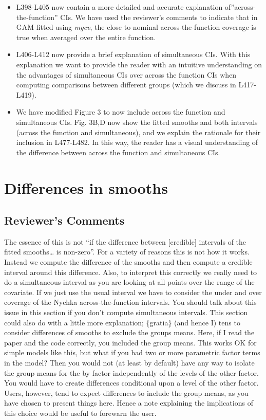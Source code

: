 \documentclass[
]{article}
\begin{document}
\begin{itemize}
\item
  L398-L405 now contain a more detailed and accurate explanation of''across-the-function'' CIs. We have used the reviewer's comments to indicate that in GAM fitted using \emph{mgcv}, the close to nominal across-the-function coverage is true when averaged over the entire function.
\item
  L406-L412 now provide a brief explanation of simultaneous CIs. With this explanation we want to provide the reader with an intuitive understanding on the advantages of simultaneous CIs over across the function CIs when computing comparisons between different groups (which we discuss in L417-L419).
\item
  We have modified Figure 3 to now include across the function and simultaneous CIs. Fig. 3B,D now show the fitted smooths and both intervals (across the function and simultaneous), and we explain the rationale for their inclusion in L477-L482. In this way, the reader has a visual understanding of the difference between across the function and simultaneous CIs.
\end{itemize}

\hypertarget{differences-in-smooths}{%
\section{Differences in smooths}\label{differences-in-smooths}}

\hypertarget{reviewers-comments-8}{%
\subsection{Reviewer's Comments}\label{reviewers-comments-8}}

The essence of this is not ``if the difference between {[}credible{]} intervals of the fitted smooths\ldots{} is non-zero''. For a variety of reasons this is not how it works. Instead we compute the difference of the smooths and then compute a credible interval around this difference. Also, to interpret this correctly we really need to do a simultaneous interval as you are looking at all points over the range of the covariate. If we just use the usual interval we have to consider the under and over coverage of the Nychka across-the-function intervals. You should talk about this issue in this section if you don't compute simultaneous intervals.
This section could also do with a little more explanation; \{gratia\} (and hence I) tens to consider differences of smooths to exclude the groups means. Here, if I read the paper and the code correctly, you included the group means. This works OK for simple models like this, but what if you had two or more parametric factor terms in the model? Then you would not (at least by default) have any way to isolate the group means for the by factor independently of the levels of the other factor. You would have to create differences conditional upon a level of the other factor. Users, however, tend to expect differences to include the group means, as you have chosen to present things here. Hence a note explaining the implications of this choice would be useful to forewarn the user.
\end{document}

